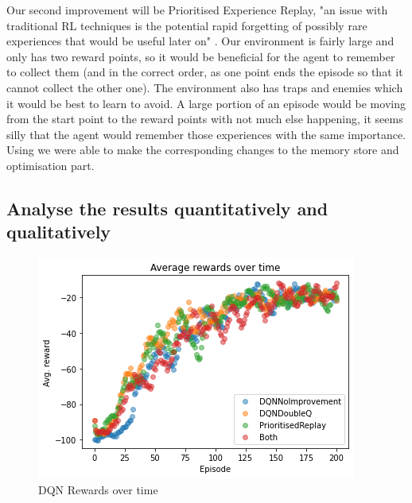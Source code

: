 \documentclass[a4pape, 11pt, english]{article}
\begin{document}
Our second improvement will be Prioritised Experience Replay, "an issue with traditional RL techniques is the potential rapid forgetting of possibly rare experiences that would be useful later on" \citep[p 1]{schaul_prioritized_2015}. Our environment is fairly large and only has two reward points, so it would be beneficial for the agent to remember to collect them (and in the correct order, as one point ends the episode so that it cannot collect the other one). The environment also has traps and enemies which it would be best to learn to avoid. A large portion of an episode would be moving from the start point to the reward points with not much else happening, it seems silly that the agent would remember those experiences with the same importance. Using \citep[algorithm 1]{schaul_prioritized_2015} we were able to make the corresponding changes to the memory store and optimisation part.

\subsection{Analyse the results quantitatively and qualitatively}

\begin{figure}[h!]
	\begin{center}
		\includegraphics{img/DQNRewardsOverTime.png}
		\caption{DQN Rewards over time}
		\label{fig:DQNRewardsOverTime}
	\end{center}
\end{figure}
\end{document}
